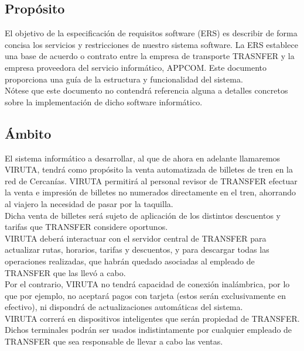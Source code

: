 \subsection{Propósito}

El objetivo de la especificación de requisitos software (ERS) es describir de forma concisa los servicios y restricciones de nuestro sistema software. La ERS establece una base de acuerdo o contrato entre la empresa de transporte TRASNFER y la empresa proveedora del servicio informático, APPCOM. Este documento proporciona una guía de la estructura y funcionalidad del sistema.\\

Nótese que este documento no contendrá referencia alguna a detalles concretos sobre la implementación de dicho software informático.

\subsection{Ámbito}

El sistema informático a desarrollar, al que de ahora en adelante llamaremos VIRUTA, tendrá como propósito la venta automatizada de billetes de tren en la red de Cercanías. VIRUTA permitirá al personal revisor de TRANSFER efectuar la venta e impresión de billetes no numerados directamente en el tren, ahorrando al viajero la necesidad de pasar por la taquilla.\\

Dicha venta de billetes será sujeto de aplicación de los distintos descuentos y tarifas que TRANSFER considere oportunos.\\

VIRUTA deberá interactuar con el servidor central de TRANSFER para actualizar rutas, horarios, tarifas y descuentos, y para descargar todas las operaciones realizadas, que habrán quedado asociadas al empleado de TRANSFER que las llevó a cabo.\\

Por el contrario, VIRUTA no tendrá capacidad de conexión inalámbrica, por lo que por ejemplo, no aceptará pagos con tarjeta (estos serán exclusivamente en efectivo), ni dispondrá de actualizaciones automáticas del sistema.\\

VIRUTA correrá en dispositivos inteligentes que serán propiedad de TRANSFER. Dichos terminales podrán ser usados indistintamente por cualquier empleado de TRANSFER que sea responsable de llevar a cabo las ventas.\\


